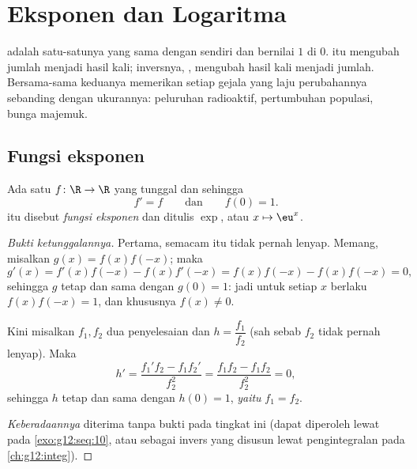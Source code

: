 \chapter{Eksponen dan Logaritma}\label{ch:g12:exp}

 adalah satu-satunya  yang sama dengan  sendiri
dan bernilai $1$ di $0$.  itu mengubah jumlah menjadi hasil kali;
inversnya, , mengubah hasil kali menjadi jumlah. Bersama-sama
keduanya memerikan setiap gejala yang laju perubahannya sebanding dengan
ukurannya: peluruhan radioaktif, pertumbuhan populasi, bunga majemuk.

\section{Fungsi eksponen}

\begin{theorem}\label{thm:g12:exp:existence}
Ada satu  $f \colon \R \to \R$ yang tunggal dan  sehingga
\[
f' = f \qquad\text{dan}\qquad f(0) = 1 .
\]
 itu disebut \emph{fungsi eksponen} dan ditulis
$\exp$, atau $x \mapsto \eu^x$.
\end{theorem}

\begin{proof}[Bukti ketunggalannya]
Pertama,  semacam itu tidak pernah lenyap. Memang, misalkan
$g(x) = f(x)f(-x)$; maka
\[
g'(x) = f'(x)f(-x) - f(x)f'(-x) = f(x)f(-x) - f(x)f(-x) = 0,
\]
sehingga $g$ tetap dan sama dengan $g(0) = 1$: jadi untuk setiap $x$ berlaku
$f(x)f(-x) = 1$, dan khususnya $f(x) \neq 0$.

Kini misalkan $f_1, f_2$ dua penyelesaian dan $h = \dfrac{f_1}{f_2}$ (sah
sebab $f_2$ tidak pernah lenyap). Maka
\[
h' = \frac{f_1' f_2 - f_1 f_2'}{f_2^2} = \frac{f_1 f_2 - f_1 f_2}{f_2^2} = 0,
\]
sehingga $h$ tetap dan sama dengan $h(0) = 1$, \emph{yaitu} $f_1 = f_2$.

\emph{Keberadaannya} diterima tanpa bukti pada tingkat ini (dapat diperoleh
lewat  pada \cref{exo:g12:seq:10}, atau sebagai invers 
yang disusun lewat pengintegralan pada \cref{ch:g12:integ}).
\end{proof}

